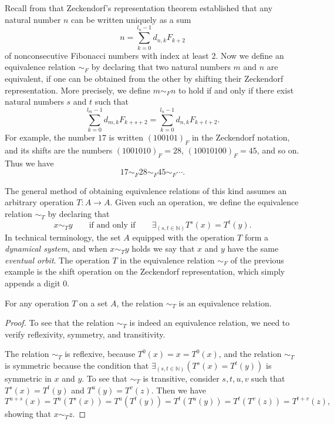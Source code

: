 \begin{example}
  Recall from  that Zeckendorf's representation theorem established that any natural number $n$ can be written uniquely as a sum
  \begin{equation*}
    n= \sum_{k=0}^{l_n-1} d_{n,k}F_{k+2}
  \end{equation*}
  of nonconsecutive Fibonacci numbers with index at least $2$. Now we define an equivalence relation $\sim_F$ by declaring that two natural numbers $m$ and $n$ are equivalent, if one can be obtained from the other by shifting their Zeckendorf representation. More precisely, we define $m\sim_F n$ to hold if and only if there exist natural numbers $s$ and $t$ such that
  \begin{equation*}
    \sum_{k=0}^{l_m-1}d_{m,k}F_{k+s+2} = \sum_{k=0}^{l_n-1} d_{n,k}F_{k+t+2}.
  \end{equation*}
  For example, the number $17$ is written $(100101)_F$ in the Zeckendorf notation, and its shifts are the numbers $(1001010)_F=28$, $(10010100)_F=45$, and so on. Thus we have
  \begin{equation*}
    17 \sim_F 28 \sim_F 45 \sim_F\cdots.
  \end{equation*}
\end{example}

The general method of obtaining equivalence relations of this kind assumes an arbitrary operation $T:A\to A$. Given such an operation, we define the equivalence relation $\sim_T$ by declaring that
\begin{equation*}
  x\sim_T y \qquad\text{if and only if}\qquad \exists_{(s,t\in\mathbb{N})} T^s(x)=T^t(y).
\end{equation*}
In technical terminology, the set $A$ equipped with the operation $T$ form a \emph{dynamical system}, and when $x\sim_T y$ holds we say that $x$ and $y$ have the same \emph{eventual orbit}. The operation $T$ in the equivalence relation $\sim_F$ of the previous example is the shift operation on the Zeckendorf representation, which simply appends a digit $0$.

\begin{proposition}
  For any operation $T$ on a set $A$, the relation $\sim_T$ is an equivalence relation.
\end{proposition}

\begin{proof}
  To see that the relation $\sim_T$ is indeed an equivalence relation, we need to verify reflexivity, symmetry, and transitivity.

  The relation $\sim_T$ is reflexive, because $T^0(x)=x=T^0(x)$, and the relation $\sim_T$ is symmetric because the condition that $\exists_{(s,t\in\mathbb{N})}(T^s(x)=T^t(y))$ is symmetric in $x$ and $y$. To see that $\sim_T$ is transitive, consider $s,t,u,v$ such that $T^s(x)=T^t(y)$ and $T^u(y)=T^v(z)$. Then we have
  \begin{equation*}
    T^{u+s}(x)=T^u(T^s(x))=T^u(T^t(y))=T^t(T^u(y))=T^t(T^v(z))=T^{t+v}(z),
  \end{equation*}
  showing that $x\sim_T z$.
\end{proof}

